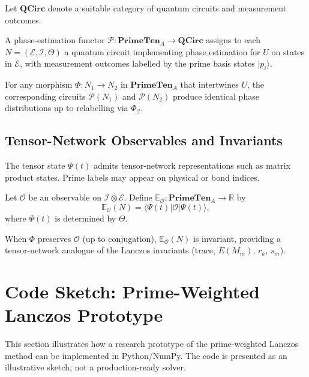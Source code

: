 \documentclass[11pt]{article}
\begin{document}
Let $\mathbf{QCirc}$ denote a suitable category of quantum circuits and
measurement outcomes.

\begin{definition}
A phase-estimation functor $\mathcal{P} :
\mathbf{PrimeTen}_A \to \mathbf{QCirc}$ assigns to each
$N=(\mathcal{E},\mathcal{I},\Theta)$ a quantum circuit implementing
phase estimation for $U$ on states in $\mathcal{E}$, with measurement
outcomes labelled by the prime basis states $|p_i\rangle$.
\end{definition}

\begin{proposition}
For any morphism $\Phi : N_1\to N_2$ in $\mathbf{PrimeTen}_A$ that
intertwines $U$, the corresponding circuits $\mathcal{P}(N_1)$ and
$\mathcal{P}(N_2)$ produce identical phase distributions up to
relabelling via $\Phi_{\mathcal{I}}$.
\end{proposition}

\subsection{Tensor-Network Observables and Invariants}

The tensor state $\Psi(t)$ admits tensor-network representations such as
matrix product states.\cite{PrimeEigenSolversTensor} Prime labels may
appear on physical or bond indices.

\begin{definition}
Let $\mathcal{O}$ be an observable on $\mathcal{I}\otimes\mathcal{E}$. Define
$\mathbb{E}_{\mathcal{O}} : \mathbf{PrimeTen}_A \to \mathbb{R}$ by
\[
\mathbb{E}_{\mathcal{O}}(N) =
\langle \Psi(t)|\mathcal{O}|\Psi(t)\rangle,
\]
where $\Psi(t)$ is determined by $\Theta$.
\end{definition}

When $\Phi$ preserves $\mathcal{O}$ (up to conjugation),
$\mathbb{E}_{\mathcal{O}}(N)$ is invariant, providing a tensor-network
analogue of the Lanczos invariants (trace, $E(M_m)$, $r_k$, $s_m$).

\section{Code Sketch: Prime-Weighted Lanczos Prototype}

This section illustrates how a research prototype of the prime-weighted
Lanczos method can be implemented in Python/NumPy. The code is
presented as an illustrative sketch, not a production-ready solver.
\end{document}
